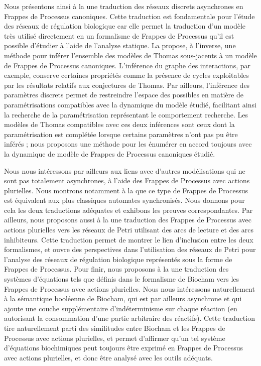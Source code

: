 Nous présentons ainsi à la  une traduction des réseaux discrets asynchrones
en Frappes de Processus canoniques.
Cette traduction est fondamentale pour l'étude des réseaux de régulation biologique
car elle permet la traduction d'un modèle très utilisé directement en un formalisme
de Frappes de Processus qu'il est possible d'étudier à l'aide de l'analyse statique.
La  propose, à l'inverse, une méthode pour inférer l'ensemble des modèles
de Thomas sous-jacents à un modèle de Frappes de Processus canoniques.
L'inférence du graphe des interactions, par exemple,
conserve certaines propriétés comme la présence de cycles
exploitables par les résultats relatifs aux conjectures de Thomas.
Par ailleurs, l'inférence des paramètres discrets permet de restreindre l'espace des possibles
en matière de paramétrisations compatibles avec la dynamique du modèle étudié,
facilitant ainsi la recherche de la paramétrisation représentant le comportement recherche.
Les modèles de Thomas compatibles avec ces deux inférences sont ceux dont la paramétrisation
est complétée lorsque certains paramètres n'ont pas pu être inférés ;
nous proposons une méthode pour les énumérer en accord toujours avec la dynamique
de modèle de Frappes de Processus canoniques étudié.

Nous nous intéressons par ailleurs aux liens avec d'autres modélisations
qui ne sont pas totalement asynchrones,
à l'aide des Frappes de Processus avec actions plurielles.
Nous montrons notamment à la  que ce type de Frappes de Processus
est équivalent aux plus classiques automates synchronisés.
Nous donnons pour cela les deux traductions adéquates et exhibons les preuves correspondantes.
Par ailleurs, nous proposons aussi à la 
une traduction des Frappes de Processus avec actions
plurielles vers les réseaux de Petri utilisant des arcs de lecture et des arcs inhibiteurs.
Cette traduction permet de montrer le lien d'inclusion entre les deux formalismes,
et ouvre des perspectives dans l'utilisation des réseaux de Petri pour l'analyse des réseaux
de régulation biologique représentés sous la forme de Frappes de Processus.
Pour finir, nous proposons à la  une traduction des systèmes d'équations tels
que définis dans le formalisme de Biocham vers les Frappes de Processus avec actions plurielles.
Nous nous intéressons naturellement à la sémantique booléenne de Biocham,
qui est par ailleurs asynchrone et qui ajoute une couche supplémentaire d'indéterminisme
sur chaque réaction (en autorisant la consommation d'une partie arbitraire des réactifs).
Cette traduction tire naturellement parti des similitudes entre Biocham et les Frappes
de Processus avec actions plurielles, et permet d'affirmer
qu'un tel système d'équations biochimiques peut toujours être exprimé
en Frappes de Processus avec actions plurielles,
et donc être analysé avec les outils adéquats.

